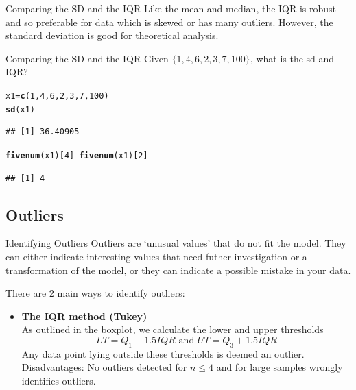 \documentclass[t,xcolor=pdftex,dvipsnames,table]{beamer}
\makeatletter
\newcommand{\hlnum}[1]{\textcolor[rgb]{0.686,0.059,0.569}{#1}}%
\newcommand{\hlopt}[1]{\textcolor[rgb]{0,0,0}{#1}}%
\newcommand{\hlstd}[1]{\textcolor[rgb]{0.345,0.345,0.345}{#1}}%
\newcommand{\hlkwb}[1]{\textcolor[rgb]{0.69,0.353,0.396}{#1}}%
\newcommand{\hlkwd}[1]{\textcolor[rgb]{0.737,0.353,0.396}{\textbf{#1}}}%
\newenvironment{kframe}{%
 \def\at@end@of@kframe{}%
 \ifinner\ifhmode%
  \def\at@end@of@kframe{\end{minipage}}%
  \begin{minipage}{\columnwidth}%
 \fi\fi%
 \def\FrameCommand##1{\hskip\@totalleftmargin \hskip-\fboxsep
 \colorbox{shadecolor}{##1}\hskip-\fboxsep
     \hskip-\linewidth \hskip-\@totalleftmargin \hskip\columnwidth}%
 \MakeFramed {\advance\hsize-\width
   \@totalleftmargin\z@ \linewidth\hsize
   \@setminipage}}%
 {\par\unskip\endMakeFramed%
 \at@end@of@kframe}
\newenvironment{knitrout}{}{} %
\makeatother
\begin{document}
\begin{frame}[fragile]{Comparing the SD and the IQR}
Like the mean and median, the IQR is robust and so preferable for data which is skewed or has many outliers. However, the standard deviation is good for theoretical analysis.

\vspace{.5cm}
\begin{block}{Comparing the SD and the IQR}
Given $\{ 1,4,6,2,3,7,100\}$, what is the sd and IQR?
\end{block}

\begin{knitrout}
\color{fgcolor}\begin{kframe}
\begin{alltt}
\hlstd{x1}\hlkwb{=}\hlkwd{c}\hlstd{(}\hlnum{1}\hlstd{,}\hlnum{4}\hlstd{,}\hlnum{6}\hlstd{,}\hlnum{2}\hlstd{,}\hlnum{3}\hlstd{,}\hlnum{7}\hlstd{,}\hlnum{100}\hlstd{)}
\hlkwd{sd}\hlstd{(x1)}
\end{alltt}
\begin{verbatim}
## [1] 36.40905
\end{verbatim}
\begin{alltt}
\hlkwd{fivenum}\hlstd{(x1)[}\hlnum{4}\hlstd{]} \hlopt{-} \hlkwd{fivenum}\hlstd{(x1)[}\hlnum{2}\hlstd{]}
\end{alltt}
\begin{verbatim}
## [1] 4
\end{verbatim}
\end{kframe}
\end{knitrout}
\end{frame}

\subsection[]{Outliers}
\begin{frame}[fragile]{Identifying Outliers}
Outliers are `unusual values' that do not fit the model. They can either indicate interesting values that need futher investigation or a transformation of the model, or they can indicate a possible mistake in your data.

\vspace{.5cm}
There are 2 main ways to identify outliers:
\begin{itemize}
\item {\bf The IQR method (Tukey)} \\
As outlined in the boxplot, we calculate the lower and upper thresholds
\[ LT = Q_{1} - 1.5 IQR  \mbox{  and   }  UT = Q_{3} + 1.5 IQR  \]
Any data point lying outside these thresholds is deemed an outlier. \\
Disadvantages:  No outliers detected for $n \leq 4$ and for large samples wrongly identifies outliers.
\end{itemize}
\end{frame}
\end{document}
